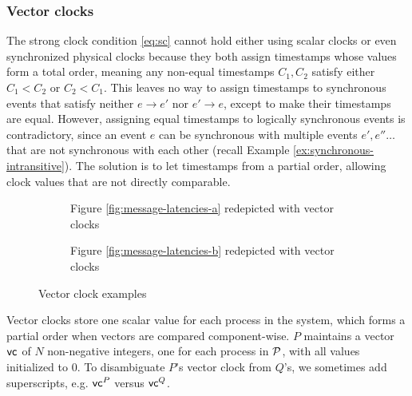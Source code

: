 \documentclass[]             %
{NASA}                       %
\theoremstyle{definition}
\begin{document}
\subsubsection{Vector clocks}
\label{sssec:vector-clocks}
The strong clock condition \eqref{eq:sc} cannot hold either using
scalar clocks or even synchronized physical clocks because they both
assign timestamps whose values form a total order, meaning any
non-equal timestamps $C_1, C_2$ satisfy either $C_1 < C_2$ or
$C_2 < C_1$. This leaves no way to assign timestamps to synchronous
events that satisfy neither $e \to e'$ nor $e' \to e$, except to make
their timestamps are equal. However, assigning equal timestamps to
logically synchronous events is contradictory, since an event $e$ can
be synchronous with multiple events $e', e''\ldots$ that are not
synchronous with each other (recall Example
\ref{ex:synchronous-intransitive}). The solution is to let timestamps
from a partial order, allowing clock values that are not directly
comparable.


\begin{figure}
  \setlength\belowcaptionskip{5ex}

  \begin{subfigure}{1\textwidth}
    \centering
    
    \caption{Figure \ref{fig:message-latencies-a} redepicted with vector clocks}
    \label{fig:message-latencies-vector-a}
  \end{subfigure}

  \vspace{4ex}

  \begin{subfigure}{1\textwidth}
    \centering 
    \caption{Figure \ref{fig:message-latencies-b} redepicted with vector clocks}
    \label{fig:message-latencies-vector-b}
  \end{subfigure}

  \caption{Vector clock examples}
  \label{fig:message-latencies-vector}
\end{figure}
\afterpage{\clearpage}

Vector clocks store one scalar value for each process in the system,
which forms a partial order when vectors are compared
component-wise. $P$ maintains a vector $\mathsf{vc}^{}$ of $N$ non-negative
integers, one for each process in $\mathcal{P}$, with all values
initialized to $0$. To disambiguate $P$'s vector clock from $Q$'s, we
sometimes add superscripts, e.g. $\mathsf{vc}^{P}$ versus $\mathsf{vc}^{Q}$.
\end{document}
